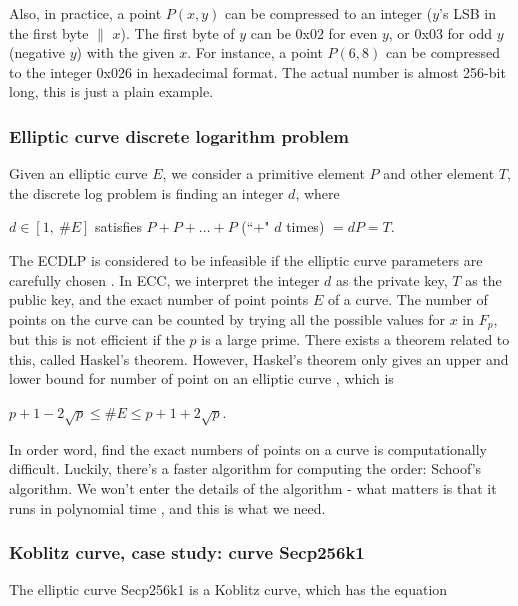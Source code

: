 Also, in practice, a point $P(x,y)$ can be compressed to an integer ($y$’s LSB in the first byte $\|$  $x$). The first byte of $y$ can be 0x02 for even $y$, or 0x03 for odd $y$ (negative $y$) with the given $x$. For instance, a point $P(6, 8)$ can be compressed to the integer 0x026 in hexadecimal format. The actual number is almost 256-bit long, this is just a plain example.

\subsubsection{Elliptic curve discrete logarithm problem}

Given an elliptic curve $E$, we consider a primitive element $P$ and other element $T$, the discrete log problem is finding an integer $d$, where

\begin{center}
$d \in [1, \ \#E]$ satisfies $P + P + \dotso + P$ (``+" $d$ times) $= dP = T$.
\end{center}

The ECDLP is considered to be infeasible if the elliptic curve parameters are carefully chosen \cite{DBLP:journals/iacr/BosCLN14}. In ECC, we interpret the integer $d$ as the private key, $T$ as the public key, and the exact number of point points $E$ of a curve. The number of points on the curve can be counted by trying all the possible values for $x$ in $F_p$, but this is not efficient if the $p$ is a large prime. There exists a theorem related to this, called Haskel’s theorem. However, Haskel’s theorem only gives an upper and lower bound for number of point on an elliptic curve \cite{DBLP:journals/iacr/BosCLN14}, which is

\begin{center}
  $p+1-2\sqrt{p} \leq \#E \leq p+1+2\sqrt{p}$.
\end{center}

In order word, find the exact numbers of points on a curve is computationally difficult. Luckily, there's a faster algorithm for computing the order: Schoof's algorithm. We won't enter the details of the algorithm - what matters is that it runs in polynomial time \cite{Schoof}, and this is what we need.

\subsubsection{Koblitz curve, case study: curve Secp256k1}
The elliptic curve Secp256k1 is a Koblitz curve, which has the equation

